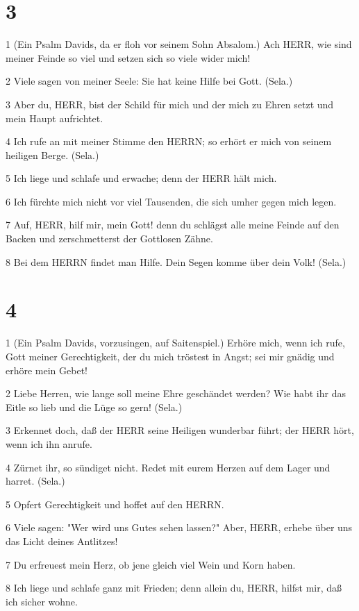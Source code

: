 \chapter{3}

\par 1 (Ein Psalm Davids, da er floh vor seinem Sohn Absalom.) Ach HERR, wie sind meiner Feinde so viel und setzen sich so viele wider mich!
\par 2 Viele sagen von meiner Seele: Sie hat keine Hilfe bei Gott. (Sela.)
\par 3 Aber du, HERR, bist der Schild für mich und der mich zu Ehren setzt und mein Haupt aufrichtet.
\par 4 Ich rufe an mit meiner Stimme den HERRN; so erhört er mich von seinem heiligen Berge. (Sela.)
\par 5 Ich liege und schlafe und erwache; denn der HERR hält mich.
\par 6 Ich fürchte mich nicht vor viel Tausenden, die sich umher gegen mich legen.
\par 7 Auf, HERR, hilf mir, mein Gott! denn du schlägst alle meine Feinde auf den Backen und zerschmetterst der Gottlosen Zähne.
\par 8 Bei dem HERRN findet man Hilfe. Dein Segen komme über dein Volk! (Sela.)

\chapter{4}

\par 1 (Ein Psalm Davids, vorzusingen, auf Saitenspiel.) Erhöre mich, wenn ich rufe, Gott meiner Gerechtigkeit, der du mich tröstest in Angst; sei mir gnädig und erhöre mein Gebet!
\par 2 Liebe Herren, wie lange soll meine Ehre geschändet werden? Wie habt ihr das Eitle so lieb und die Lüge so gern! (Sela.)
\par 3 Erkennet doch, daß der HERR seine Heiligen wunderbar führt; der HERR hört, wenn ich ihn anrufe.
\par 4 Zürnet ihr, so sündiget nicht. Redet mit eurem Herzen auf dem Lager und harret. (Sela.)
\par 5 Opfert Gerechtigkeit und hoffet auf den HERRN.
\par 6 Viele sagen: "Wer wird uns Gutes sehen lassen?" Aber, HERR, erhebe über uns das Licht deines Antlitzes!
\par 7 Du erfreuest mein Herz, ob jene gleich viel Wein und Korn haben.
\par 8 Ich liege und schlafe ganz mit Frieden; denn allein du, HERR, hilfst mir, daß ich sicher wohne.

